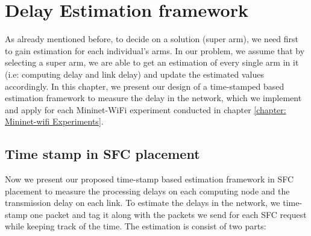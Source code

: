 \chapter{\textbf{Delay Estimation framework}}
\label{chap:estimation}
As already mentioned before, to decide on a solution (super arm), we need first to gain estimation for each individual's arms. In our problem, we assume that by selecting a super arm, we are able to get an estimation of every single arm in it (i.e: computing delay and link delay) and update the estimated values accordingly. 
In this chapter, we present our design of a time-stamped based estimation framework to measure the delay in the network, which we implement and apply for each Mininet-WiFi experiment conducted in chapter \ref{chapter: Mininet-wifi Experiments}. 

%
%
%

\section{Time stamp in SFC placement}
Now we present our proposed time-stamp based estimation framework in SFC placement to measure the processing delays on each computing node and the transmission delay on each link. %
To estimate the delays in the network, we time-stamp\cite{} one packet and tag it along with the packets we send for each SFC request while keeping track of the time. The estimation is consist of two parts:


